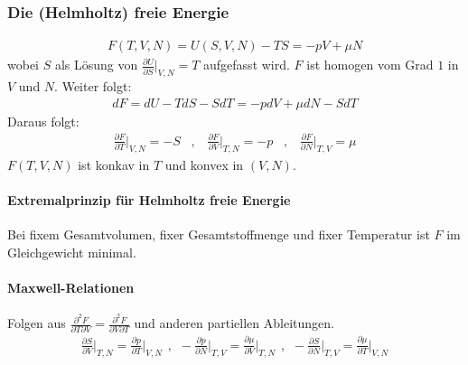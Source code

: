 \subsubsection{Die (Helmholtz) freie Energie}
\begin{align*}
    F(T,V,N) = U(S,V,N) - T S = - p V + \mu N
\end{align*}
wobei $S$ als Lösung von $\frac{\partial U}{\partial S} \Big|_{V,N} = T$
aufgefasst wird. $F$ ist homogen vom Grad $1$ in $V$ und $N$. Weiter folgt:
\begin{align*}
    dF = dU - T dS - S dT
    = -p dV + \mu dN - S dT
\end{align*}
Daraus folgt:
\begin{align*}
    \frac{\partial F}{\partial T} \Big|_{V,N} = -S
    \hspace{10pt} , \hspace{10pt}
    \frac{\partial F}{\partial V} \Big|_{T,N} = -p
    \hspace{10pt} , \hspace{10pt}
    \frac{\partial F}{\partial N} \Big|_{T,V} = \mu
\end{align*}
$F(T,V,N)$ ist konkav in $T$ und konvex in $(V,N)$.

\paragraph{Extremalprinzip für Helmholtz freie Energie}
Bei fixem Gesamtvolumen, fixer Gesamtstoffmenge und fixer Temperatur ist $F$
im Gleichgewicht minimal.

\paragraph{Maxwell-Relationen}
Folgen aus $\frac{\partial^2 F}{\partial T \partial V} =
\frac{\partial^2 F}{\partial V \partial T}$ und anderen partiellen
Ableitungen.
\begin{align*}
    \frac{\partial S}{\partial V} \Big|_{T,N}
    = \frac{\partial p}{\partial T} \Big|_{V,N}
    \hspace{5pt} , \hspace{5pt}
    - \frac{\partial p}{\partial N} \Big|_{T,V}
    = \frac{\partial \mu}{\partial V} \Big|_{T,N}
    \hspace{5pt} , \hspace{5pt}
    - \frac{\partial S}{\partial N} \Big|_{T,V}
    = \frac{\partial \mu}{\partial T} \Big|_{V,N}
\end{align*}

